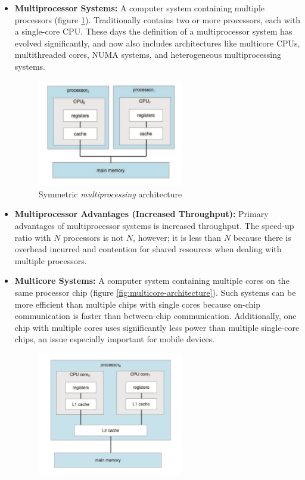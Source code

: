 \documentclass[12pt]{article}
\begin{document}
\begin{itemize}
    \item \textbf{Multiprocessor Systems:} A computer system containing multiple processors (figure \ref{fig:symmetric-multiprocessing-architecture}). Traditionally contains two or more processors, each with a single-core CPU. These days the definition of a multiprocessor system has evolved significantly, and now also includes architectures like multicore CPUs, multithreaded cores, NUMA systems, and heterogeneous multiprocessing systems.
        \begin{figure}[ht]
            \centering
            \includegraphics[width=0.6\textwidth]{figures/symmetric-multiprocessing-architecture.jpg}
            \caption{Symmetric \textit{multiprocessing} architecture}
            \label{fig:symmetric-multiprocessing-architecture}
        \end{figure}
    \item \textbf{Multiprocessor Advantages (Increased Throughput):} Primary advantages of multiprocessor systems is increased throughput. The speed-up ratio with \(N\) processors is not \(N\), however; it is less than \(N\) because there is overhead incurred and contention for shared resources when dealing with multiple processors.
    \item \textbf{Multicore Systems:} A computer system containing multiple cores on the same processor chip (figure \ref{fig:multicore-architecture}). Such systems can be more efficient than multiple chips with single cores because on-chip communication is faster than between-chip communication. Additionally, one chip with multiple cores uses significantly less power than multiple single-core chips, an issue especially important for mobile devices.
        \begin{figure}[ht]
            \centering
            \includegraphics[width=0.6\textwidth]{figures/multicore-architecture.jpg}

\end{figure}
\end{itemize}
\end{document}
